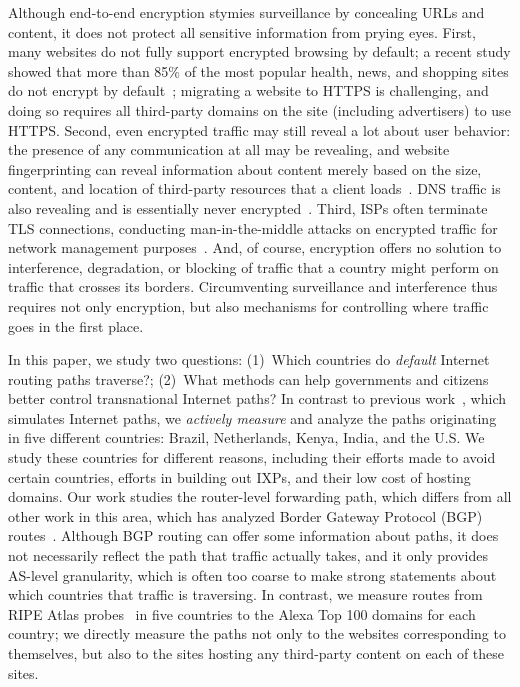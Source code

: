 Although end-to-end encryption stymies surveillance by concealing URLs
and content, it does not protect all sensitive information from prying
eyes. First, many websites do not fully support encrypted browsing by
default; a recent study showed that more than 85\% of the most popular
health, news, and shopping sites do not encrypt by
default~\cite{what_isps_can_see}; migrating a website to HTTPS is
challenging, and doing so requires all third-party domains on the site
(including advertisers) to use HTTPS.  Second, even encrypted traffic
may still reveal a lot about user behavior: the presence of any
communication at all may be revealing, and website fingerprinting can
reveal information about content merely based on the size, content, and
location of third-party resources that a client loads~\cite{Johnson2013a}. DNS traffic is
also revealing and is essentially never
encrypted~\cite{what_isps_can_see}.  Third, ISPs often terminate TLS
connections, conducting man-in-the-middle attacks on encrypted traffic
for network management purposes~\cite{mitm_isp}.  And, of course,
encryption offers no solution to interference, degradation, or blocking
of traffic that a country might perform on traffic that crosses its
borders.  Circumventing surveillance and interference thus requires not
only encryption, but also mechanisms for controlling where traffic goes
in the first place.

In this paper, we study two questions: (1)~Which countries do {\em
  default} Internet routing paths traverse?; (2)~What methods can 
help governments and citizens
better control transnational Internet paths?  In contrast to previous
work~\cite{karlin2009nation}, which simulates Internet paths, we
\textit{actively measure} and analyze the paths originating in five
different countries: Brazil, Netherlands, Kenya, India, and the U.S.
We study these countries for different reasons, including their
efforts made to avoid certain countries, efforts in building out IXPs,
and their low cost of hosting domains.  Our work studies the
router-level forwarding path, which differs from all other work in this
area, which has analyzed Border Gateway Protocol
(BGP) routes~\cite{karlin2009nation,shah2015characterizing}.  Although
BGP routing can offer some information about paths, it does not
necessarily reflect the path that traffic actually takes, and it only
provides AS-level granularity, which is often too coarse to make strong
statements about which countries that traffic is traversing.  In
contrast, we measure routes from RIPE Atlas probes~\cite{ripe_atlas} in five
countries to the Alexa Top 100 domains for each country; we directly
measure the paths not only to the websites corresponding to
themselves, but also to the sites hosting any third-party content on
each of these sites.

